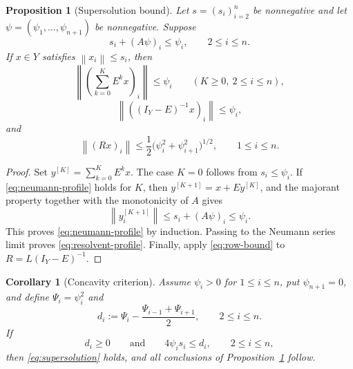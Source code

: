 \documentclass[11pt]{amsart}
\numberwithin{equation}{section}
\newtheorem{proposition}[proposition]{Proposition}
\newtheorem{corollary}[corollary]{Corollary}
\theoremstyle{remark}
\newcommand{\norm}[1]{\left\lVert #1\right\rVert}
\begin{document}
\begin{proposition}[Supersolution bound]\label{prop:supersolution}
Let $s=(s_i)_{i=2}^n$ be nonnegative and let
$\psi=(\psi_1,\ldots,\psi_{n+1})$ be nonnegative.  Suppose
\begin{equation}\label{eq:supersolution}
 s_i+(A\psi)_i\leq\psi_i,
 \qquad 2\leq i\leq n.
\end{equation}
If $x\in Y$ satisfies $\norm{x_i}\leq s_i$, then
\begin{equation}\label{eq:neumann-profile}
 \norm{\left(\sum_{k=0}^{K}E^kx\right)_i}\leq\psi_i
 \qquad(K\geq0,
 \ 2\leq i\leq n),
\end{equation}
\begin{equation}\label{eq:resolvent-profile}
 \norm{((I_Y-E)^{-1}x)_i}\leq\psi_i,
\end{equation}
and
\begin{equation}\label{eq:R-profile}
 \norm{(Rx)_i}
 \leq\frac12\bigl(\psi_i^2+\psi_{i+1}^2\bigr)^{1/2},
 \qquad 1\leq i\leq n.
\end{equation}
\end{proposition}

\begin{proof}
Set $y^{[K]}=\sum_{k=0}^K E^kx$.  The case $K=0$ follows from
$s_i\leq\psi_i$.  If \eqref{eq:neumann-profile} holds for $K$, then
$y^{[K+1]}=x+Ey^{[K]}$, and the majorant property together with the monotonicity
of $A$ gives
\[
 \norm{y_i^{[K+1]}}
 \leq s_i+(A\psi)_i\leq\psi_i.
\]
This proves \eqref{eq:neumann-profile} by induction.  Passing to the Neumann
series limit proves \eqref{eq:resolvent-profile}.  Finally, apply
\eqref{eq:row-bound} to $R=L(I_Y-E)^{-1}$.
\end{proof}

\begin{corollary}[Concavity criterion]\label{cor:concavity}
Assume $\psi_i>0$ for $1\leq i\leq n$, put $\psi_{n+1}=0$, and define
$\Psi_i=\psi_i^2$ and
\begin{equation}\label{eq:defect}
 d_i:=\Psi_i-\frac{\Psi_{i-1}+\Psi_{i+1}}2,
 \qquad 2\leq i\leq n.
\end{equation}
If
\begin{equation}\label{eq:concavity-criterion}
 d_i\geq0
 \qquad\text{and}\qquad
 4\psi_i s_i\leq d_i,
 \qquad 2\leq i\leq n,
\end{equation}
then \eqref{eq:supersolution} holds, and all conclusions of
Proposition~\ref{prop:supersolution} follow.
\end{corollary}
\end{document}
